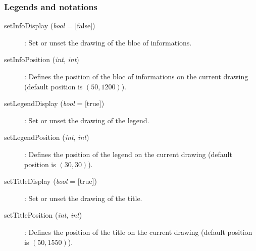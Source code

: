 \subsubsection{Legends and notations}
\begin{description}
\item [{setInfoDisplay (\emph{bool} = [false])}] : Set or unset the drawing of the bloc of informations.
\item [{setInfoPosition (\emph{int}, \emph{int})}] : Defines the position of the bloc of informations on the current drawing (default position is $(50, 1200)$).
\item [{setLegendDisplay (\emph{bool} = [true])}] :  Set or unset the drawing of the legend.
\item [{setLegendPosition (\emph{int}, \emph{int})}] : Defines the position of the legend on the current drawing (default position is $(30, 30)$).
\item [{setTitleDisplay (\emph{bool} = [true])}] :  Set or unset the drawing of the title.
\item [{setTitlePosition (\emph{int}, \emph{int})}] : Defines the position of the title on the current drawing (default position is $(50, 1550)$).
\end{description}

